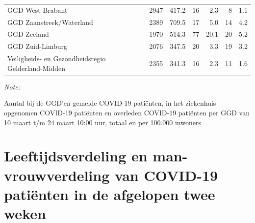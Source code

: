 \documentclass[
  english,
  man,floatsintext]{apa6}
\begin{document}
\begin{table}
\begin{threeparttable}
\begin{tabular}{lrrrrrr}
GGD West-Brabant & 2947 & 417.2 & 16 & 2.3 & 8 & 1.1\\
GGD Zaanstreek/Waterland & 2389 & 709.5 & 17 & 5.0 & 14 & 4.2\\
GGD Zeeland & 1970 & 514.3 & 77 & 20.1 & 20 & 5.2\\
GGD Zuid-Limburg & 2076 & 347.5 & 20 & 3.3 & 19 & 3.2\\
Veiligheids- en Gezondheidsregio Gelderland-Midden & 2355 & 341.3 & 16 & 2.3 & 11 & 1.6\\
\bottomrule
\end{tabular}
\begin{tablenotes}
\item \textit{Note: } 
\item Aantal bij de GGD’en gemelde COVID-19 patiënten, in het ziekenhuis opgenomen COVID-19 patiënten en overleden COVID-19 patiënten per GGD van 10 maart t/m 24 maart 10:00 uur, totaal en per 100.000 inwoners
\end{tablenotes}
\end{threeparttable}
\endgroup{}
\end{table}

\newpage

\hypertarget{leeftijdsverdeling-en-man-vrouwverdeling-van-covid-19-patiuxebnten-in-de-afgelopen-twee-weken}{%
\section{Leeftijdsverdeling en man-vrouwverdeling van COVID-19 patiënten in de afgelopen twee weken}\label{leeftijdsverdeling-en-man-vrouwverdeling-van-covid-19-patiuxebnten-in-de-afgelopen-twee-weken}}
\end{document}
